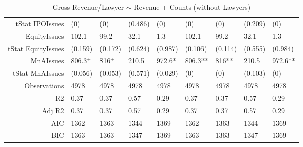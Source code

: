 \begin{table}[ht]
\begin{tabular}{rllllllll}
  tStat IPOIssues & (0) & (0) & (0.486) & (0) & (0) & (0) & (0.209) & (0) \\ 
  EquityIssues & 102.1 & 99.2 & 32.1 & 1.3 & 102.1 & 99.2 & 32.1 & 1.3 \\ 
  tStat EquityIssues & (0.159) & (0.172) & (0.624) & (0.987) & (0.106) & (0.114) & (0.555) & (0.984) \\ 
  MnAIssues & 806.3$^{+}$ & 816$^{+}$ & 210.5 & 972.6* & 806.3** & 816** & 210.5 & 972.6** \\ 
  tStat MnAIssues & (0.056) & (0.053) & (0.571) & (0.029) & (0) & (0) & (0.103) & (0) \\ 
  Observations & 4978 & 4978 & 4978 & 4978 & 4978 & 4978 & 4978 & 4978 \\ 
  R2 & 0.37 & 0.37 & 0.57 & 0.29 & 0.37 & 0.37 & 0.57 & 0.29 \\ 
  Adj R2 & 0.37 & 0.37 & 0.57 & 0.29 & 0.37 & 0.37 & 0.57 & 0.29 \\ 
  AIC & 1362 & 1363 & 1344 & 1369 & 1362 & 1363 & 1344 & 1369 \\ 
  BIC & 1363 & 1363 & 1347 & 1369 & 1363 & 1363 & 1347 & 1369 \\ 
   \hline
\end{tabular}
\caption{Gross Revenue/Lawyer $\sim$ Revenue + Counts (without Lawyers)} 
\end{table}
